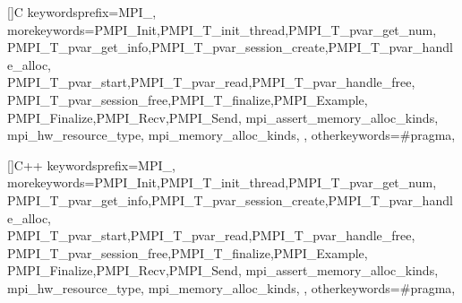 \newcommand{\toolchangebeg}[1]{\cbstart{\color{green}#1}\xspace}
\newcommand{\toolchangeend}{\cbend}

\newcommand{\chgfeba}[1]{\toolchangebeg{#1}\toolchangeend}
\newcommand{\chgfebb}[1]{\toolchangebeg{#1}\toolchangeend}

\renewcommand{\textfraction}{0.07}
\renewcommand{\floatpagefraction}{0.9}
\setcounter{topnumber}{10}
\setcounter{bottomnumber}{10}
\setcounter{totalnumber}{20} 
   
\def\eg{e.g.}

\usepackage{listings}
\usepackage{inconsolata}



[]{C}%
{%
        keywordsprefix={MPI_},%
        morekeywords={PMPI_Init,PMPI_T_init_thread,PMPI_T_pvar_get_num,%
PMPI_T_pvar_get_info,PMPI_T_pvar_session_create,PMPI_T_pvar_handle_alloc,%
PMPI_T_pvar_start,PMPI_T_pvar_read,PMPI_T_pvar_handle_free,%
PMPI_T_pvar_session_free,PMPI_T_finalize,PMPI_Example,%
PMPI_Finalize,PMPI_Recv,PMPI_Send,%
mpi_assert_memory_alloc_kinds,
mpi_hw_resource_type,
mpi_memory_alloc_kinds,
},%
        otherkeywords={\#pragma},
}

[]{C++}%
{%
        keywordsprefix={MPI_},%
        morekeywords={PMPI_Init,PMPI_T_init_thread,PMPI_T_pvar_get_num,%
PMPI_T_pvar_get_info,PMPI_T_pvar_session_create,PMPI_T_pvar_handle_alloc,%
PMPI_T_pvar_start,PMPI_T_pvar_read,PMPI_T_pvar_handle_free,%
PMPI_T_pvar_session_free,PMPI_T_finalize,PMPI_Example,%
PMPI_Finalize,PMPI_Recv,PMPI_Send,%
mpi_assert_memory_alloc_kinds,
mpi_hw_resource_type,
mpi_memory_alloc_kinds,
},%
        otherkeywords={\#pragma},
}

